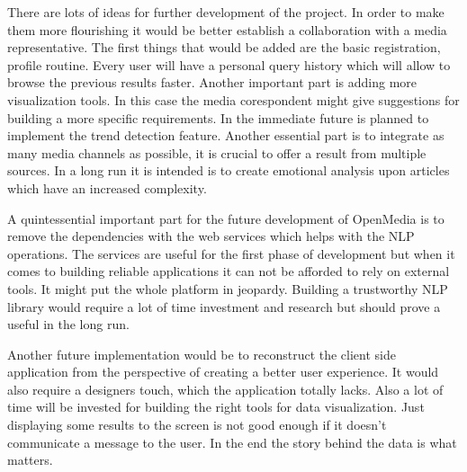 There are lots of ideas for further development of the project. In order to make them more flourishing it would be better establish a collaboration with a media representative. The first things that would be added are the basic registration, profile routine. Every user will have a personal query history which will allow to browse the previous results faster. Another important part is adding more visualization tools. In this case the media corespondent might give suggestions for building a more specific requirements. In the immediate future is planned to implement the trend detection feature. Another essential part is to integrate as many media channels as possible, it is crucial to offer a result from multiple sources. In a long run it is intended is to create emotional analysis upon articles which have an increased complexity.

A quintessential important part for the future development of OpenMedia is to remove the dependencies with the web services which helps with the NLP operations. The services are useful for the first phase of development but when it comes to building reliable applications it can not be afforded to rely on external tools. It might put the whole platform in jeopardy. Building a trustworthy NLP library would require a lot of time investment and research but should prove a useful in the long run.

Another future implementation would be to reconstruct the client side application from the perspective of creating a better user experience. It would also require a designers touch, which the application totally lacks. Also a lot of time will be invested for building the right tools for data visualization. Just displaying some results to the screen is not good enough if it doesn't communicate a message to the user. In the end the story behind the data is what matters.
\clearpage